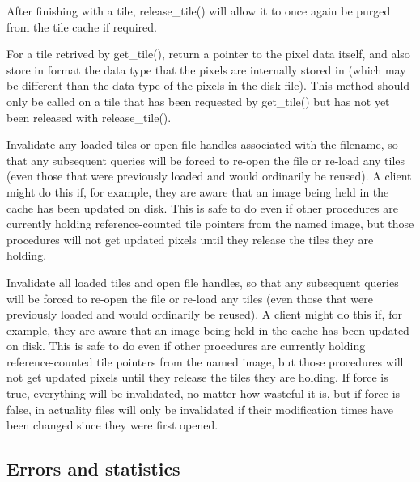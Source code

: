 After finishing with a tile, {\cf release_tile()} will allow it to 
once again be purged from the tile cache if required.
\apiend

For a tile retrived by {\cf get_tile()}, return a pointer to the
pixel data itself, and also store in {\cf format} the data type that
the pixels are internally stored in (which may be different than
the data type of the pixels in the disk file).  This method should
only be called on a tile that has been requested by 
{\cf get_tile()} but has not yet been released with {\cf release_tile()}.
\apiend

Invalidate any loaded tiles or open file handles associated with
the filename, so that any subsequent queries will be forced to
re-open the file or re-load any tiles (even those that were
previously loaded and would ordinarily be reused).  A client
might do this if, for example, they are aware that an image
being held in the cache has been updated on disk.  This is safe
to do even if other procedures are currently holding 
reference-counted tile pointers from the named image, but those 
procedures will not get updated pixels until they release the 
tiles they are holding.
\apiend

Invalidate all loaded tiles and open file handles, so that any
subsequent queries will be forced to re-open the file or re-load any
tiles (even those that were previously loaded and would ordinarily be
reused).  A client might do this if, for example, they are aware that an
image being held in the cache has been updated on disk.  This is safe to
do even if other procedures are currently holding reference-counted tile
pointers from the named image, but those procedures will not get updated
pixels until they release the tiles they are holding.  If force is true,
everything will be invalidated, no matter how wasteful it is, but if
force is false, in actuality files will only be invalidated if their
modification times have been changed since they were first opened.
\apiend

\subsection{Errors and statistics}
\label{sec:imagecache:api:geterror}
\label{sec:imagecache:api:getstats}
\label{sec:imagecache:api:resetstats}

